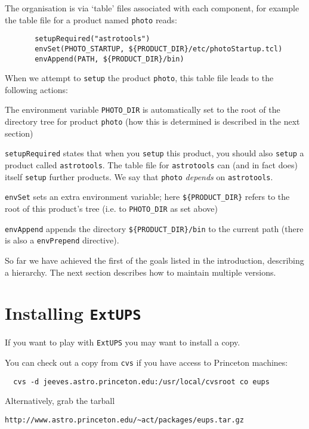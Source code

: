 \documentclass{article}
\newcommand{\code}[1]{\texttt{#1}}
\newcommand{\eups}{\code{ExtUPS}}
\begin{document}
The organisation is via `table' files
associated with each component, for example the table file
for a product named \code{photo} reads:
\begin{verbatim}
       setupRequired("astrotools")
       envSet(PHOTO_STARTUP, ${PRODUCT_DIR}/etc/photoStartup.tcl)
       envAppend(PATH, ${PRODUCT_DIR}/bin)
\end{verbatim}

When we attempt to \code{setup} the product \code{photo}, this
table file leads to the following actions:
\begin{description}
\item
  The environment variable \code{PHOTO\_DIR} is automatically set to 
  the root of the directory tree for product \code{photo} (how this
  is determined is described in the next section)
\item
  \code{setupRequired} states that when you \code{setup} this product, you
  should also \code{setup} a product called \code{astrotools}.
  The table file for \code{astrotools} can
  (and in fact does) itself \code{setup} further products.  We say that
  \code{photo} \emph{depends} on \code{astrotools}.
\item
  \code{envSet} sets an extra environment variable; here \code{\$\{PRODUCT\_DIR\}}
  refers to the root of this product's tree (i.e. to \code{PHOTO\_DIR} as set above)
\item
  \code{envAppend} appends
  the directory \code{\$\{PRODUCT\_DIR\}/bin} to the current path (there
  is also a \code{envPrepend} directive).
\end{description}

So far we have achieved the first of the goals listed in the introduction,
describing a hierarchy.  The next section describes how to maintain
multiple versions.

\section{Installing \eups}

If you want to play with \eups{} you may want to install a copy.

You can check out a copy from \code{cvs} if you have access to
Princeton machines:
\begin{verbatim}
  cvs -d jeeves.astro.princeton.edu:/usr/local/cvsroot co eups
\end{verbatim}

Alternatively, grab the tarball
\begin{verbatim}
http://www.astro.princeton.edu/~act/packages/eups.tar.gz
\end{verbatim}
\end{document}
